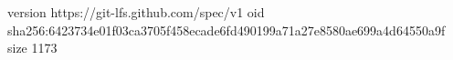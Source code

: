 version https://git-lfs.github.com/spec/v1
oid sha256:6423734e01f03ca3705f458ecade6fd490199a71a27e8580ae699a4d64550a9f
size 1173
